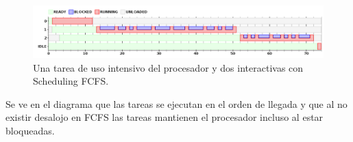 \begin{figure}[h!]
  \caption{Una tarea de uso intensivo del procesador y dos interactivas con Scheduling FCFS.}
  \centering
    \includegraphics[width=1\textwidth]{img/ejercicio2.png}
\end{figure}

Se ve en el diagrama que las tareas se ejecutan en el orden de llegada y que al no existir desalojo en FCFS las tareas mantienen el procesador incluso al estar bloqueadas.

